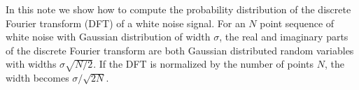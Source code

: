 In this note we show how to compute the probability distribution of the discrete Fourier transform (DFT) of a white noise signal.
For an $N$ point sequence of white noise with Gaussian distribution of width $\sigma$, the real and imaginary parts of the discrete Fourier transform are both Gaussian distributed random variables with widths $\sigma\sqrt{N/2}$.
If the DFT is normalized by the number of points $N$, the width becomes $\sigma / \sqrt{2N}$.
